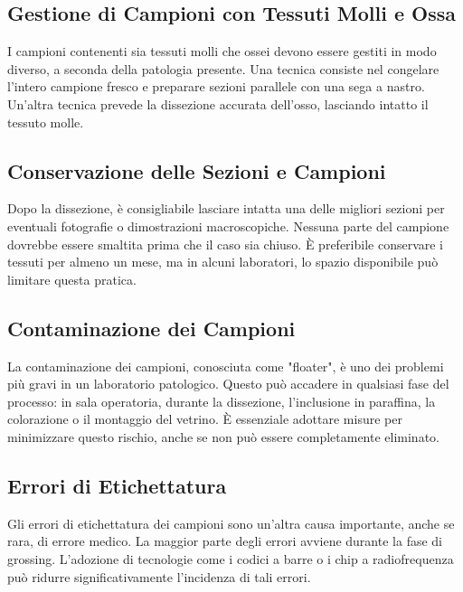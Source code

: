 \subsection{Gestione di Campioni con Tessuti Molli e Ossa}
I campioni contenenti sia tessuti molli che ossei devono essere gestiti in modo diverso, a seconda della patologia presente. Una tecnica consiste nel congelare l'intero campione fresco e preparare sezioni parallele con una sega a nastro. Un'altra tecnica prevede la dissezione accurata dell'osso, lasciando intatto il tessuto molle.

\subsection{Conservazione delle Sezioni e Campioni}
Dopo la dissezione, è consigliabile lasciare intatta una delle migliori sezioni per eventuali fotografie o dimostrazioni macroscopiche. Nessuna parte del campione dovrebbe essere smaltita prima che il caso sia chiuso. È preferibile conservare i tessuti per almeno un mese, ma in alcuni laboratori, lo spazio disponibile può limitare questa pratica.

\subsection{Contaminazione dei Campioni}
La contaminazione dei campioni, conosciuta come "floater", è uno dei problemi più gravi in un laboratorio patologico. Questo può accadere in qualsiasi fase del processo: in sala operatoria, durante la dissezione, l'inclusione in paraffina, la colorazione o il montaggio del vetrino. È essenziale adottare misure per minimizzare questo rischio, anche se non può essere completamente eliminato.

\subsection{Errori di Etichettatura}
Gli errori di etichettatura dei campioni sono un'altra causa importante, anche se rara, di errore medico. La maggior parte degli errori avviene durante la fase di grossing. L'adozione di tecnologie come i codici a barre o i chip a radiofrequenza può ridurre significativamente l'incidenza di tali errori.
